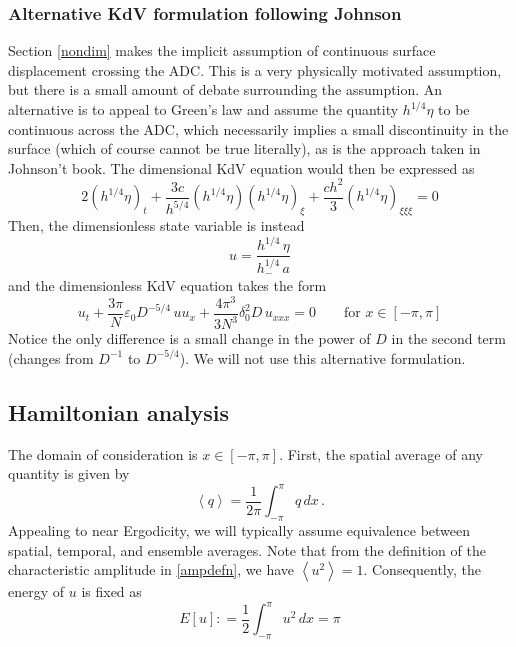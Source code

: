 \documentclass[11pt]{article}
\newcommand{\mean}[1]{\left< #1 \right>}
\newcommand{\eps}{\varepsilon}
\newcommand{\defeq}{\mathrel{\mathop:}=}
\newcommand{\depth}{h}
\newcommand{\dup}{\depth_{-}}
\newcommand{\lamfac}{N}
\newcommand{\amp}{a}
\newcommand{\epsup}{\eps_0}
\newcommand{\delup}{\delta_0}
\newcommand{\drat}{D}
\newcommand{\dx}{\, dx}
\begin{document}
\subsubsection{Alternative KdV formulation following Johnson}
Section \ref{nondim} makes the implicit assumption of continuous surface displacement crossing the ADC. This is a very physically motivated assumption, but there is a small amount of debate surrounding the assumption. An alternative is to appeal to Green's law and assume the quantity $\depth^{1/4} \eta$ to be continuous across the ADC, which necessarily implies a small discontinuity in the surface (which of course cannot be true literally), as is the approach taken in Johnson't book. The dimensional KdV equation would then be expressed as
\begin{equation}
2 (\depth^{1/4} \eta)_t + \frac{3 c}{\depth^{5/4}} (\depth^{1/4} \eta) (\depth^{1/4} \eta)_{\xi} + \frac{c \depth^2}{3} (\depth^{1/4} \eta)_{\xi \xi \xi} = 0
\end{equation}
Then, the dimensionless state variable is instead 
\begin{equation}
u = \frac{\depth^{1/4} \, \eta}{ \dup^{1/4} \, \amp}
\end{equation}
and the dimensionless KdV equation takes the form
\begin{equation}
u_t + \frac{3 \pi}{\lamfac} \epsup \drat^{-5/4} \, u u_x + \frac{4 \pi^3}{3 \lamfac^3} \delup^2 \drat \, u_{xxx} = 0
\qquad \text{for } x \in [-\pi,\pi]
\end{equation}
Notice the only difference is a small change in the power of $\drat$ in the second term (changes from $\drat^{-1}$ to $\drat^{-5/4}$).
We will not use this alternative formulation.


\subsection{Hamiltonian analysis}

The domain of consideration is $x \in [-\pi,\pi]$. First, the spatial average of any quantity is given by
\begin{equation}
\mean{q} = \frac{1}{2\pi} \int_{-\pi}^{\pi} q \dx \, .
\end{equation}
Appealing to near Ergodicity, we will typically assume equivalence between spatial, temporal, and ensemble averages. Note that from the definition of the characteristic amplitude in \eqref{ampdefn}, we have $\mean{u^2} = 1$. Consequently, the energy of $u$ is fixed as
\begin{equation}
E[u] \defeq \frac{1}{2} \int_{-\pi}^{\pi} u^2 \dx = \pi
\end{equation}
\end{document}
